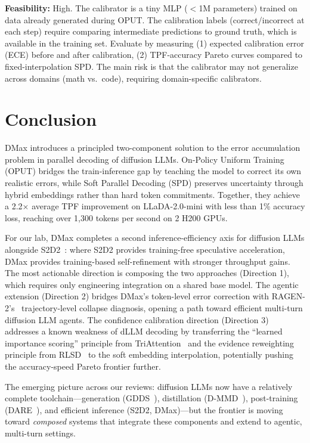 \documentclass[11pt]{article}
\begin{document}
\textbf{Feasibility:} High. The calibrator is a tiny MLP ($<$1M parameters) trained on data already generated during OPUT. The calibration labels (correct/incorrect at each step) require comparing intermediate predictions to ground truth, which is available in the training set. Evaluate by measuring (1) expected calibration error (ECE) before and after calibration, (2) TPF-accuracy Pareto curves compared to fixed-interpolation SPD. The main risk is that the calibrator may not generalize across domains (math vs.\ code), requiring domain-specific calibrators.

\section{Conclusion}

DMax introduces a principled two-component solution to the error accumulation problem in parallel decoding of diffusion LLMs. On-Policy Uniform Training (OPUT) bridges the train-inference gap by teaching the model to correct its own realistic errors, while Soft Parallel Decoding (SPD) preserves uncertainty through hybrid embeddings rather than hard token commitments. Together, they achieve a 2.2$\times$ average TPF improvement on LLaDA-2.0-mini with less than 1\% accuracy loss, reaching over 1,300 tokens per second on 2 H200 GPUs.

For our lab, DMax completes a second inference-efficiency axis for diffusion LLMs alongside S2D2~\cite{s2d2}: where S2D2 provides training-free speculative acceleration, DMax provides training-based self-refinement with stronger throughput gains. The most actionable direction is composing the two approaches (Direction 1), which requires only engineering integration on a shared base model. The agentic extension (Direction 2) bridges DMax's token-level error correction with RAGEN-2's~\cite{ragen2} trajectory-level collapse diagnosis, opening a path toward efficient multi-turn diffusion LLM agents. The confidence calibration direction (Direction 3) addresses a known weakness of dLLM decoding by transferring the ``learned importance scoring'' principle from TriAttention~\cite{triattention} and the evidence reweighting principle from RLSD~\cite{rlsd} to the soft embedding interpolation, potentially pushing the accuracy-speed Pareto frontier further.

The emerging picture across our reviews: diffusion LLMs now have a relatively complete toolchain---generation (GDDS~\cite{gdds}), distillation (D-MMD~\cite{dmmd}), post-training (DARE~\cite{dare}), and efficient inference (S2D2, DMax)---but the frontier is moving toward \textit{composed} systems that integrate these components and extend to agentic, multi-turn settings.
\end{document}
